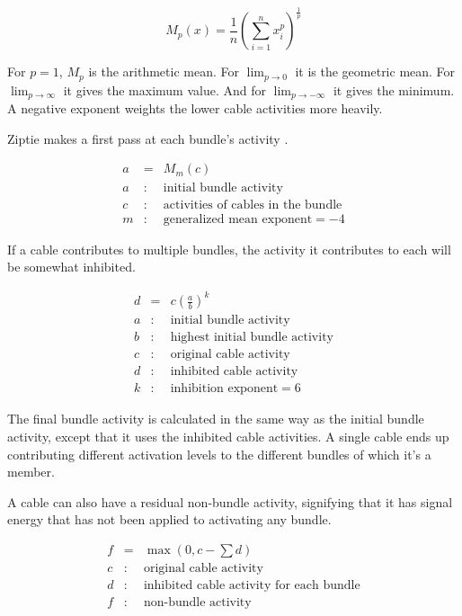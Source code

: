 \documentclass[oneside,twocolumn]{article}
\begin{document}
\begin{equation*}
M_p(x) = {\frac{1}{n}\left( \sum_{i=1}^{n}x_i^p  \right)}^{\frac{1}{p}} 
\end{equation*}

For $p = 1$, $M_p$ is the arithmetic mean. For $\lim_{p \to 0}$ it is the geometric mean. For $\lim_{p \to \infty}$ it gives the maximum value. And for   $\lim_{p \to -\infty}$ it gives the minimum. A negative exponent weights the lower cable activities more heavily. 

Ziptie makes a first pass at each bundle's activity .

\begin{eqnarray*}
a &=& M_m(c)\\ 
a &:& \mbox{initial bundle activity}\\ 
c &:& \mbox{activities of cables in the bundle}\\
m &:& \mbox{generalized mean exponent} = -4
\end{eqnarray*}

If a cable contributes to multiple bundles, the activity it contributes to each will be somewhat inhibited.

\begin{eqnarray*}
d &=& c \left( \frac{a}{b} \right) ^ k\\ 
a &:& \mbox{initial bundle activity}\\ 
b &:& \mbox{highest initial bundle activity}\\ 
c &:& \mbox{original cable activity}\\
d &:& \mbox{inhibited cable activity}\\
k &:& \mbox{inhibition exponent} = 6
\end{eqnarray*}

The final bundle activity is calculated in the same way as the initial bundle activity, except that it uses the inhibited cable activities. A single cable ends up contributing different activation levels to the different bundles of which it's a member.

A cable can also have a residual non-bundle activity, signifying that it has signal energy that has not been applied to activating any bundle.

\begin{eqnarray*}
f &=& \max \left (0, c - \sum d \right)\\ 
c &:& \mbox{original cable activity}\\
d &:& \mbox{inhibited cable activity for each bundle}\\
f &:& \mbox{non-bundle activity}
\end{eqnarray*}
\end{document}
